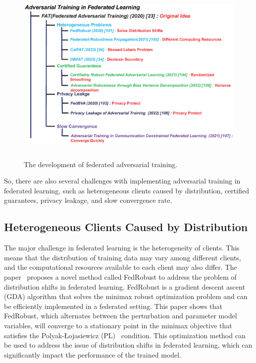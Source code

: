 \documentclass[a4paper,fleqn]{cas-dc}
\begin{document}
\begin{figure}[h]
	\centering
	\includegraphics[width=1.0\linewidth,height=3.5in]{output/fig20.eps}
	\caption{The development of federated adversarial training.}
	\label{fig20}
\end{figure}


So, there are also several challenges with
implementing adversarial training in federated learning, such as
heterogeneous clients caused by distribution, certified
guarantees, privacy leakage, and slow convergence rate.

\subsection{Heterogeneous Clients Caused by Distribution}
The major challenge in federated learning is the
heterogeneity of clients. This means that the distribution of
training data may vary among different clients, and the
computational resources available to each client may also
differ. The paper~\cite{reisizadeh2020robust} proposes a novel method called
FedRobust to address the problem of distribution shifts
in federated learning. FedRobust is a gradient descent
ascent (GDA) algorithm that solves the minimax robust
optimization problem and can be eﬀiciently implemented
in a federated setting. This paper shows that FedRobust,
which alternates between the perturbation and parameter
model variables, will converge to a stationary point in the
minimax objective that satisfies the Polyak-Łojasiewicz
(PL)~\cite{polyak1963gradient} condition. This optimization method can be
used to address the issue of distribution shifts in federated
learning, which can significantly impact the performance
of the trained model.
\end{document}

